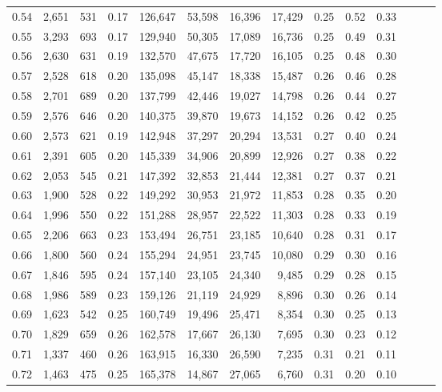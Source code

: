 \begin{tabular}{rrrrrrrrrrrrrr}
0.54 &  2,651 &  531 &  0.17 &  126,647 &   53,598 &  16,396 &  17,429 &  0.25 &  0.52 &      0.33 \\
0.55 &  3,293 &  693 &  0.17 &  129,940 &   50,305 &  17,089 &  16,736 &  0.25 &  0.49 &      0.31 \\
0.56 &  2,630 &  631 &  0.19 &  132,570 &   47,675 &  17,720 &  16,105 &  0.25 &  0.48 &      0.30 \\
0.57 &  2,528 &  618 &  0.20 &  135,098 &   45,147 &  18,338 &  15,487 &  0.26 &  0.46 &      0.28 \\
0.58 &  2,701 &  689 &  0.20 &  137,799 &   42,446 &  19,027 &  14,798 &  0.26 &  0.44 &      0.27 \\
0.59 &  2,576 &  646 &  0.20 &  140,375 &   39,870 &  19,673 &  14,152 &  0.26 &  0.42 &      0.25 \\
0.60 &  2,573 &  621 &  0.19 &  142,948 &   37,297 &  20,294 &  13,531 &  0.27 &  0.40 &      0.24 \\
0.61 &  2,391 &  605 &  0.20 &  145,339 &   34,906 &  20,899 &  12,926 &  0.27 &  0.38 &      0.22 \\
0.62 &  2,053 &  545 &  0.21 &  147,392 &   32,853 &  21,444 &  12,381 &  0.27 &  0.37 &      0.21 \\
0.63 &  1,900 &  528 &  0.22 &  149,292 &   30,953 &  21,972 &  11,853 &  0.28 &  0.35 &      0.20 \\
0.64 &  1,996 &  550 &  0.22 &  151,288 &   28,957 &  22,522 &  11,303 &  0.28 &  0.33 &      0.19 \\
0.65 &  2,206 &  663 &  0.23 &  153,494 &   26,751 &  23,185 &  10,640 &  0.28 &  0.31 &      0.17 \\
0.66 &  1,800 &  560 &  0.24 &  155,294 &   24,951 &  23,745 &  10,080 &  0.29 &  0.30 &      0.16 \\
0.67 &  1,846 &  595 &  0.24 &  157,140 &   23,105 &  24,340 &   9,485 &  0.29 &  0.28 &      0.15 \\
0.68 &  1,986 &  589 &  0.23 &  159,126 &   21,119 &  24,929 &   8,896 &  0.30 &  0.26 &      0.14 \\
0.69 &  1,623 &  542 &  0.25 &  160,749 &   19,496 &  25,471 &   8,354 &  0.30 &  0.25 &      0.13 \\
0.70 &  1,829 &  659 &  0.26 &  162,578 &   17,667 &  26,130 &   7,695 &  0.30 &  0.23 &      0.12 \\
0.71 &  1,337 &  460 &  0.26 &  163,915 &   16,330 &  26,590 &   7,235 &  0.31 &  0.21 &      0.11 \\
0.72 &  1,463 &  475 &  0.25 &  165,378 &   14,867 &  27,065 &   6,760 &  0.31 &  0.20 &      0.10 \\

\end{tabular}
